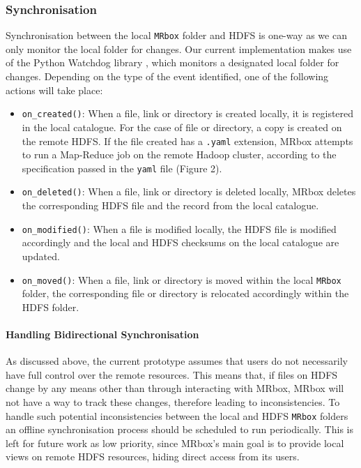 \subsubsection{Synchronisation}
Synchronisation between the local \texttt{MRbox} folder and HDFS is one-way as we can only monitor the local folder for changes. Our current implementation makes use of the Python Watchdog library \cite{watchdog}, which monitors a designated local folder for changes. Depending on the type of the event identified, one of the following actions will take place: 
\begin{itemize}
    \item \texttt{on\_created()}: When a file, link or directory is created locally, it is registered in the local catalogue. For the case of file or directory, a copy is created on the remote HDFS. If the file created has a \texttt{.yaml} extension, MRbox attempts to run a Map-Reduce job on the remote Hadoop cluster, according to the specification passed in the \texttt{yaml} file (Figure 2). 
    \item \texttt{on\_deleted()}: When a file, link or directory is deleted locally, MRbox deletes the corresponding HDFS file and the record from the local catalogue.
    \item \texttt{on\_modified()}: When a file is modified locally, the HDFS file is modified accordingly and the local and HDFS checksums on the local catalogue are updated.
    \item \texttt{on\_moved()}: When a file, link or directory is moved within the local \texttt{MRbox} folder, the corresponding file or directory is relocated accordingly within the HDFS folder. 
\end{itemize}

\paragraph{Handling Bidirectional Synchronisation}
As discussed above, the current prototype assumes that users do not necessarily have full control over the remote resources. This means that, if files on HDFS change by any means other than through interacting with MRbox, MRbox will not have a way to track these changes, therefore leading to inconsistencies. To handle such potential inconsistencies between the local and HDFS \texttt{MRbox} folders an offline synchronisation process should be scheduled to run periodically. This is left for future work as low priority, since MRbox's main goal is to provide local views on remote HDFS resources, hiding direct access from its users.

